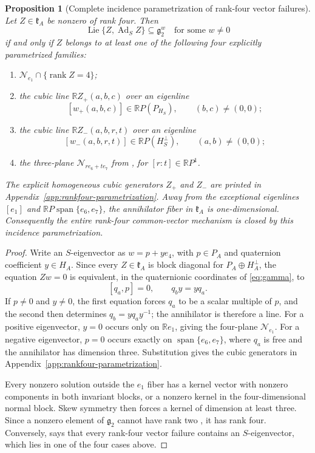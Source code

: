 \documentclass[11pt,a4paper]{article}
\newtheorem{proposition}[proposition]{Proposition}
\newcommand{\RR}{\mathbb R}
\newcommand{\gtwo}{\mathfrak g_2}
\newcommand{\Lie}{\operatorname{Lie}}
\newcommand{\Ad}{\operatorname{Ad}}
\newcommand{\Span}{\operatorname{span}}
\begin{document}
\begin{proposition}[Complete incidence parametrization of rank-four vector failures]
\label{prop:rankfour-complete}
Let $Z\in\mathfrak k_A$ be nonzero of rank four.  Then
\[
\Lie\{Z,\Ad_SZ\}\subseteq\gtwo^w
\quad\text{for some }w\ne0
\]
if and only if $Z$ belongs to at least one of the following four explicitly parametrized families:
\begin{enumerate}[label=\textnormal{(\alph*)},leftmargin=9mm]
\item $\mathcal N_{e_1}\cap\{\operatorname{rank}Z=4\}$;
\item the cubic line $\RR Z_+(a,b,c)$ over an eigenline
\[
[w_+(a,b,c)]\in\RR P(P_{H_S}),
\qquad (b,c)\ne(0,0);
\]
\item the cubic line $\RR Z_-(a,b,r,t)$ over an eigenline
\[
[w_-(a,b,r,t)]\in\RR P(H_S^\perp),
\qquad (a,b)\ne(0,0);
\]
\item the three-plane $\mathcal N_{re_6+te_7}$ from , for $[r:t]\in\RR P^1$.
\end{enumerate}
The explicit homogeneous cubic generators $Z_+$ and $Z_-$ are printed in Appendix~\ref{app:rankfour-parametrization}.  Away from the exceptional eigenlines $[e_1]$ and $\RR P\Span\{e_6,e_7\}$, the annihilator fiber in $\mathfrak k_A$ is one-dimensional.  Consequently the entire rank-four common-vector mechanism is closed by this incidence parametrization.
\end{proposition}

\begin{proof}
Write an $S$-eigenvector as $w=p+ye_4$, with $p\in P_A$ and quaternion coefficient $y\in H_A$.  Since every $Z\in\mathfrak k_A$ is block diagonal for $P_A\oplus H_A^\perp$, the equation $Zw=0$ is equivalent, in the quaternionic coordinates of \eqref{eq:gamma}, to
\[
[q_a,p]=0,
\qquad q_by=yq_a.
\]
If $p\ne0$ and $y\ne0$, the first equation forces $q_a$ to be a scalar multiple of $p$, and the second then determines $q_b=yq_ay^{-1}$; the annihilator is therefore a line.  For a positive eigenvector, $y=0$ occurs only on $\RR e_1$, giving the four-plane $\mathcal N_{e_1}$.  For a negative eigenvector, $p=0$ occurs exactly on $\Span\{e_6,e_7\}$, where $q_a$ is free and the annihilator has dimension three.  Substitution gives the cubic generators in Appendix~\ref{app:rankfour-parametrization}.

Every nonzero solution outside the $e_1$ fiber has a kernel vector with nonzero components in both invariant blocks, or a nonzero kernel in the four-dimensional normal block.  Skew symmetry then forces a kernel of dimension at least three.  Since a nonzero element of $\mathfrak g_2$ cannot have rank two \cite{ChemtovKarigiannis2022}, it has rank four.  Conversely,  says that every rank-four vector failure contains an $S$-eigenvector, which lies in one of the four cases above.
\end{proof}
\end{document}

